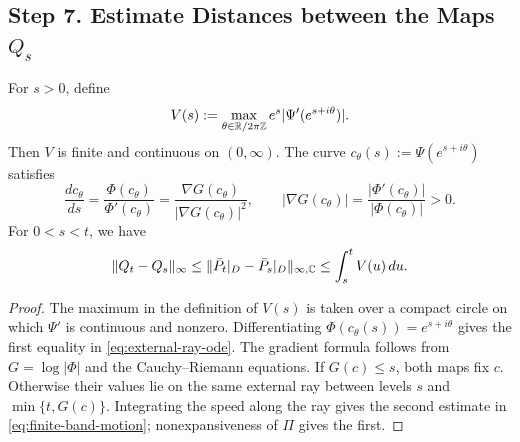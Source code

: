 \subsection{Step 7. Estimate Distances between the Maps \(Q_s\)}

\begin{lemma}
\label{lem:band-motion}
For \(s>0\), define
\[
 V(s):=\max_{\theta\in\mathbb R/2\pi\mathbb Z}
                     e^s|\Psi'(e^{s+i\theta})|.
\]
Then \(V\) is finite and continuous on \((0,\infty)\). The curve
\(c_\theta(s):=\Psi(e^{s+i\theta})\) satisfies
\begin{equation}\label{eq:external-ray-ode}
 \frac{dc_\theta}{ds}
 =\frac{\Phi(c_\theta)}{\Phi'(c_\theta)}
 =\frac{\nabla G(c_\theta)}{|\nabla G(c_\theta)|^2},
 \qquad |\nabla G(c_\theta)|
       =\frac{|\Phi'(c_\theta)|}{|\Phi(c_\theta)|}>0.
\end{equation}
For \(0<s<t\), we have
\begin{equation}\label{eq:finite-band-motion}
 \|Q_t-Q_s\|_\infty
 \le\|\bar P_t|_{D}-\bar P_s|_{D}\|_{\infty,\mathbb C}
 \le\int_s^t V(u)\,du.
\end{equation}
\end{lemma}
\begin{proof}
The maximum in the definition of \(V(s)\) is taken over a compact
circle on which \(\Psi'\) is continuous and nonzero. Differentiating
\(\Phi(c_\theta(s))=e^{s+i\theta}\) gives the first equality in
\eqref{eq:external-ray-ode}. The gradient formula follows from
\(G=\log|\Phi|\) and the Cauchy--Riemann equations. If \(G(c)\le s\),
both maps fix \(c\). Otherwise their values lie on the same external
ray between levels \(s\) and \(\min\{t,G(c)\}\). Integrating the speed
along the ray gives the second estimate in
\eqref{eq:finite-band-motion}; nonexpansiveness of \(\Pi\) gives the
first.
\end{proof}

